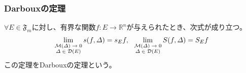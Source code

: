 \documentclass[dvipdfmx]{jsarticle}
\begin{document}
\subsubsection{Darbouxの定理}%
\begin{thm}[Darbouxの定理]\label{4.6.5.12}
$\forall E \in \mathfrak{F}_{m}$に対し、有界な関数$f:E \rightarrow \mathbb{R}^{n}$が与えられたとき、次式が成り立つ。
\begin{align*}
\lim_{\scriptsize \begin{matrix}
\mathcal{M}(\varDelta) \rightarrow 0 \\
\varDelta \in \mathcal{D}(E) \\
\end{matrix}}{s(f,\varDelta)} = s_{E}f,\ \ \lim_{\scriptsize \begin{matrix}
\mathcal{M}(\varDelta) \rightarrow 0 \\
\varDelta \in \mathcal{D}(E) \\
\end{matrix}}{S(f,\varDelta)} = S_{E}f
\end{align*}
この定理をDarbouxの定理という。
\end{thm}
\end{document}
